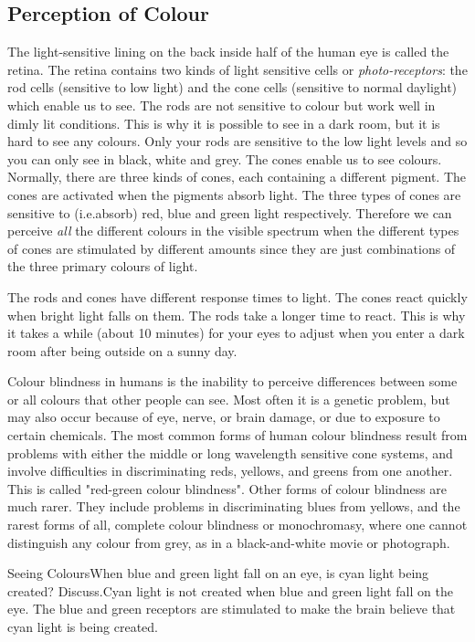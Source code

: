 \subsection{Perception of Colour}
The light-sensitive lining on the back inside half of the human eye is called the retina. 
The retina contains two kinds of light sensitive cells or \textit{photo-receptors}: the rod cells (sensitive to low light) and the cone cells (sensitive to normal daylight) which enable us to see. The rods are not sensitive to colour but work well in dimly lit conditions. This is why it is possible to see in a dark room, but it is hard to see any colours. Only your rods are sensitive to the low light levels and so you can only see in black, white and grey.
The cones enable us to see colours.
Normally, there are three kinds of cones, each containing a different pigment. The cones are activated when the pigments absorb light. 
The three types of cones are sensitive to (i.e.\@ absorb) red, blue and green light respectively. Therefore we can perceive \textit{all} the different colours in the visible spectrum when the different types of cones are stimulated by different amounts since they are just combinations of the three primary colours of light.

The rods and cones have different response times to light. The cones react quickly when bright light falls on them. The rods take a longer time to react. This is why it takes a while (about 10 minutes) for your eyes to adjust when you enter a dark room after being outside on a sunny day. 


\begin{IFact}
{Colour blindness in humans is the inability to perceive differences between some or all colours that other people can see. Most often it is a genetic problem, but may also occur because of eye, nerve, or brain damage, or due to exposure to certain chemicals. The most common forms of human colour blindness result from problems with either the middle or long wavelength sensitive cone systems, and involve difficulties in discriminating reds, yellows, and greens from one another. This is called "red-green colour blindness". Other forms of colour blindness are much rarer. They include problems in discriminating blues from yellows, and the rarest forms of all, complete colour blindness or monochromasy, where one cannot distinguish any colour from grey, as in a black-and-white movie or photograph.}
\end{IFact}
\begin{wex}{Seeing Colours}{When blue and green light fall on an eye, is cyan light being created? Discuss.}{Cyan light is not created when blue and green light fall on the eye. The blue and green receptors are stimulated to make the brain believe that cyan light is being created.}
\end{wex}

